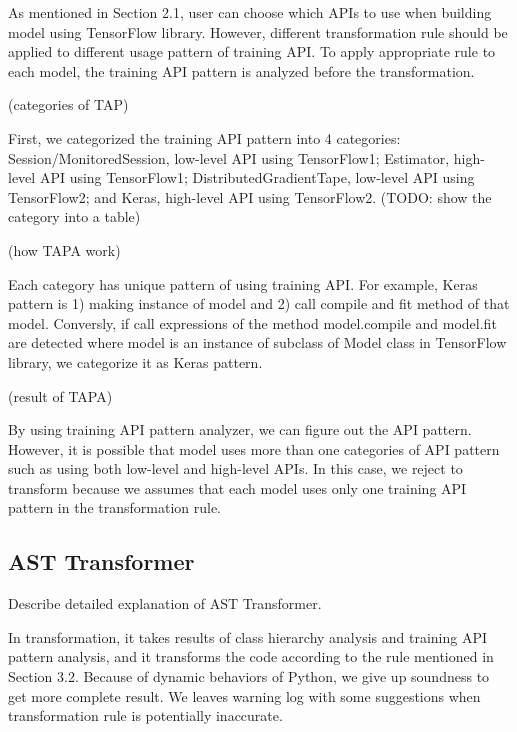 As mentioned in Section 2.1, user can choose which APIs to use
when building model using TensorFlow library.
However, different transformation rule should be applied
to different usage pattern of training API.
To apply appropriate rule to each model,
the training API pattern is analyzed before the transformation.

(categories of TAP)

First, we categorized the training API pattern into 4 categories:
Session/MonitoredSession, low-level API using TensorFlow1;
Estimator, high-level API using TensorFlow1;
DistributedGradientTape, low-level API using TensorFlow2;
and Keras, high-level API using TensorFlow2.
(TODO: show the category into a table)

(how TAPA work)

Each category has unique pattern of using training API.
For example, Keras pattern is 1) making instance of model and
2) call compile and fit method of that model.
Conversly, if call expressions of the method model.compile and model.fit are detected
where model is an instance of subclass of Model class in TensorFlow library,
we categorize it as Keras pattern.

(result of TAPA)

By using training API pattern analyzer, we can figure out the API pattern.
However, it is possible that model uses more than one categories of API pattern
such as using both low-level and high-level APIs.
In this case, we reject to transform because we assumes
that each model uses only one training API pattern in the transformation rule.

\subsection{AST Transformer}
Describe detailed explanation of AST Transformer.

In transformation, it takes results of class hierarchy analysis
and training API pattern analysis, and it transforms the code
according to the rule mentioned in Section 3.2.
Because of dynamic behaviors of Python, we give up soundness
to get more complete result.
We leaves warning log with some suggestions
when transformation rule is potentially inaccurate.


